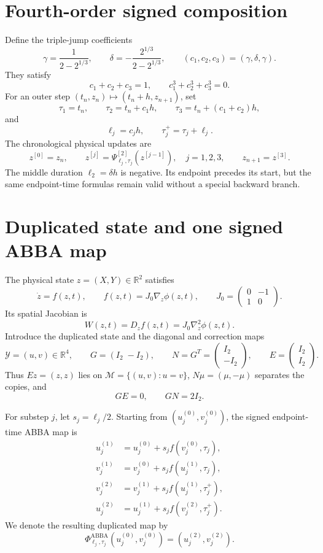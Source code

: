 \documentclass[11pt,a4paper]{article}
\newcommand{\R}{\mathbb{R}}
\newcommand{\Id}{I}
\newcommand{\Y}{\mathcal{Y}}
\newcommand{\M}{\mathcal{M}}
\newcommand{\PhiAB}{\Phi^{\mathrm{ABBA}}}
\newcommand{\PsiTwo}{\Psi^{[2]}}
\begin{document}
\section{Fourth-order signed composition}

Define the triple-jump coefficients
\[
 \gamma=\frac{1}{2-2^{1/3}},
 \qquad
 \delta=-\frac{2^{1/3}}{2-2^{1/3}},
 \qquad
 (c_1,c_2,c_3)=(\gamma,\delta,\gamma).
\]
They satisfy
\[
 c_1+c_2+c_3=1,
 \qquad
 c_1^3+c_2^3+c_3^3=0.
\]
For an outer step $(t_n,z_n)\mapsto(t_n+h,z_{n+1})$, set
\[
 \tau_1=t_n,
 \qquad
 \tau_2=t_n+c_1h,
 \qquad
 \tau_3=t_n+(c_1+c_2)h,
\]
and
\[
 \ell_j=c_jh,
 \qquad
 \tau_j^+=\tau_j+\ell_j.
\]
The chronological physical updates are
\[
 z^{[0]}=z_n,
 \qquad
 z^{[j]}=\PsiTwo_{\ell_j,\tau_j}(z^{[j-1]}),
 \quad j=1,2,3,
 \qquad
 z_{n+1}=z^{[3]}.
\]
The middle duration $\ell_2=\delta h$ is negative.  Its endpoint precedes its
start, but the same endpoint-time formulas remain valid without a special
backward branch.

\section{Duplicated state and one signed ABBA map}

The physical state $z=(X,Y)\in\R^2$ satisfies
\[
 \dot z=f(z,t),
 \qquad
 f(z,t)=J_0\nabla_z\phi(z,t),
 \qquad
 J_0=\begin{pmatrix}0&-1\\1&0\end{pmatrix}.
\]
Its spatial Jacobian is
\[
 W(z,t)=D_zf(z,t)=J_0\nabla_z^2\phi(z,t).
\]
Introduce the duplicated state and the diagonal and correction maps
\[
 \Y=(u,v)\in\R^4,
 \qquad
 G=(\Id_2\;-\Id_2),
 \qquad
 N=G^T=\begin{pmatrix}\Id_2\\-\Id_2\end{pmatrix},
 \qquad
 E=\begin{pmatrix}\Id_2\\\Id_2\end{pmatrix}.
\]
Thus $Ez=(z,z)$ lies on
\(
 \M=\{(u,v):u=v\}
\), $N\mu=(\mu,-\mu)$ separates the copies, and
\[
 GE=0,
 \qquad
 GN=2\Id_2.
\]

For substep $j$, let $s_j=\ell_j/2$.  Starting from
$(u_j^{(0)},v_j^{(0)})$, the signed endpoint-time ABBA map is
\begin{align*}
 u_j^{(1)}&=u_j^{(0)}+s_j f(v_j^{(0)},\tau_j),\\
 v_j^{(1)}&=v_j^{(0)}+s_j f(u_j^{(1)},\tau_j),\\
 v_j^{(2)}&=v_j^{(1)}+s_j f(u_j^{(1)},\tau_j^+),\\
 u_j^{(2)}&=u_j^{(1)}+s_j f(v_j^{(2)},\tau_j^+).
\end{align*}
We denote the resulting duplicated map by
\[
 \PhiAB_{\ell_j,\tau_j}(u_j^{(0)},v_j^{(0)})
 =(u_j^{(2)},v_j^{(2)}).
\]
\end{document}
